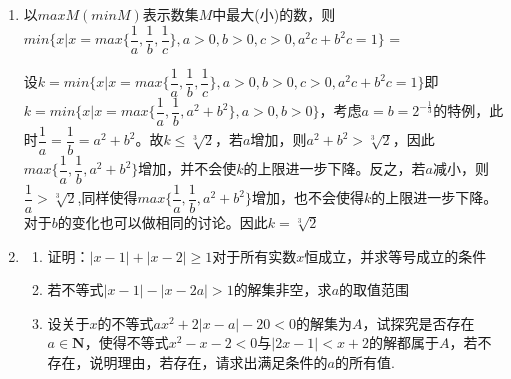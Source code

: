 \begin{enumerate}
\item 以$maxM(minM)$表示数集$M$中最大(小)的数，则$min\{x|x = max\{\dfrac{1}{a}, \dfrac{1}{b}, \dfrac{1}{c}\}, a > 0, b > 0, c > 0, a^2c+b^2c = 1\}$ = 

\begin{jieda}
设$k = min\{x|x = max\{\dfrac{1}{a}, \dfrac{1}{b}, \dfrac{1}{c}\}, a > 0, b > 0, c > 0, a^2c+b^2c = 1\}$即$k = min\{x|x = max\{\dfrac{1}{a}, \dfrac{1}{b}, a^2+b^2\}, a > 0, b > 0\}$，考虑$a = b = 2^{-\frac{1}{3}}$的特例，此时$\dfrac{1}{a} = \dfrac{1}{b} = a^2+b^2$。故$k \leq \sqrt[3]{2}$，若$a$增加，则$a^2+b^2 > \sqrt[3]{2}$，因此$max\{\dfrac{1}{a}, \dfrac{1}{b}, a^2+b^2\}$增加，并不会使$k$的上限进一步下降。反之，若$a$减小，则$\dfrac{1}{a} > \sqrt[3]{2}$,同样使得$max\{\dfrac{1}{a}, \dfrac{1}{b}, a^2+b^2\}$增加，也不会使得$k$的上限进一步下降。对于$b$的变化也可以做相同的讨论。因此$k = \sqrt[3]{2}$
\end{jieda}

\begin{vspace_}
\vsp[5]
\end{vspace_}

\item 
\begin{enumerate}[(1)]
    \item 证明：$|x-1| + |x-2| \geq 1$对于所有实数$x$恒成立，并求等号成立的条件
    \item 若不等式$|x-1| - |x-2a| > 1$的解集非空，求$a$的取值范围
    \item 设关于$x$的不等式$ax^2+2|x-a|-20<0$的解集为$A$，试探究是否存在$a \in \mathbf{N}$，使得不等式$x^2-x-2 < 0$与$|2x-1| < x+2$的解都属于$A$，若不存在，说明理由，若存在，请求出满足条件的$a$的所有值.
\end{enumerate}


\end{enumerate}
